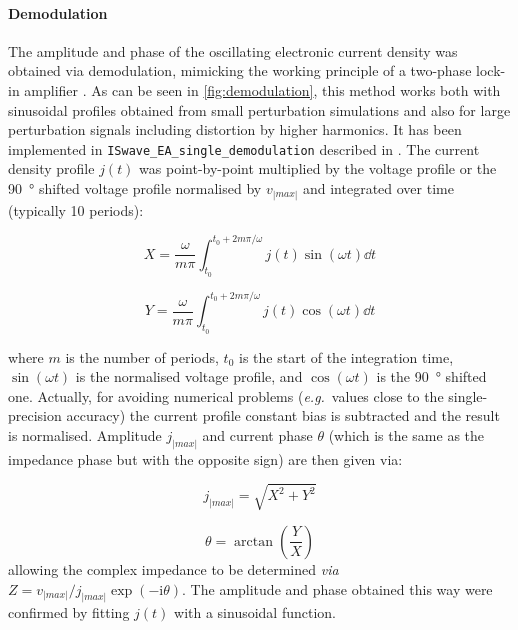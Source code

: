 	\paragraph{Demodulation}
	The amplitude and phase of the oscillating electronic current density was obtained via
	demodulation, mimicking the working principle of a two-phase lock-in amplifier \cite{WikipediaLockIn}.
	As can be seen in \cref{fig:demodulation}, this method works both with sinusoidal profiles obtained from small perturbation simulations and also for large perturbation signals including distortion by higher harmonics.
	It has been implemented in \texttt{IS\-wave\_EA\_single\_demodulation} described in .
	The current density profile $j(t)$ was point-by-point multiplied by the voltage profile or the \SI{90}{\degree} shifted
	voltage profile normalised by $v_|max|$ and integrated over time (typically 10 periods):

	\begin{equation}
		X = \frac{\omega}{m \pi} \int_{t_0}^{t_0+2m\pi / \omega} j(t) \sin(\omega t) \dd t
	\end{equation}

	\begin{equation}
		Y = \frac{\omega}{m \pi} \int_{t_0}^{t_0+2m\pi / \omega} j(t) \cos(\omega t) \dd t
	\end{equation}

	where $m$ is the number of periods, $t_0$ is the start of the integration time, $\sin(\omega t)$ is the normalised voltage profile, and $\cos(\omega t)$ is the \SI{90}{\degree} shifted one.
	Actually, for avoiding numerical problems (\textsl{e.g.}\ values close to the single\hyp{}precision accuracy) the current profile constant bias is subtracted and the result is normalised.
	Amplitude $j_|max|$ and current phase $\theta$ (which is the same as the impedance phase but with the opposite sign) are then given via:

	\begin{equation}
		j_|max| = \sqrt{X^2 + Y^2}
	\end{equation}

	\begin{equation}
		\theta = \arctan(\frac{Y}{X})
	\end{equation}
	allowing the complex impedance to be determined \textsl{via} $Z = v_|max| / j_|max| \exp(-\mathrm{i}\theta)$.
	The amplitude and phase	obtained this way were confirmed by fitting $j(t)$ with a sinusoidal function.
	
